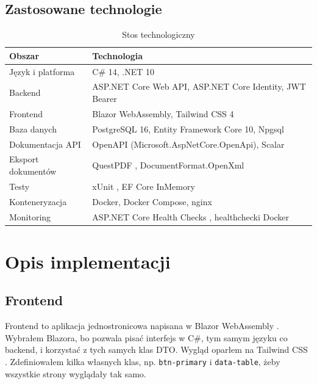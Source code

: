 \documentclass[times]{san}
\begin{document}
\subsection{Zastosowane technologie}

\begin{table}[H]
\centering
\caption{Stos technologiczny}
\label{tab:technologie}
\small
\begin{tabularx}{\textwidth}{|l|X|}
\hline
\textbf{Obszar} & \textbf{Technologia} \\
\hline
Język i platforma & C\# 14, .NET 10 \\
Backend & ASP.NET Core Web API, ASP.NET Core Identity, JWT Bearer \\
Frontend & Blazor WebAssembly, Tailwind CSS 4 \cite{tailwind} \\
Baza danych & PostgreSQL 16, Entity Framework Core 10, Npgsql \cite{npgsql} \\
Dokumentacja API & OpenAPI (Microsoft.AspNetCore.OpenApi), Scalar \\
Eksport dokumentów & QuestPDF \cite{questpdf}, DocumentFormat.OpenXml \cite{openxml} \\
Testy & xUnit \cite{xunit}, EF Core InMemory \\
Konteneryzacja & Docker, Docker Compose, nginx \\
Monitoring & ASP.NET Core Health Checks \cite{ms_healthchecks}, healthchecki Docker \\
\hline
\end{tabularx}
\end{table}

\section{Opis implementacji}

\subsection{Frontend}

Frontend to aplikacja jednostronicowa napisana w Blazor WebAssembly \cite{ms_blazor}. Wybrałem Blazora, bo pozwala pisać interfejs w C\#, tym samym języku co backend, i korzystać z tych samych klas DTO. Wygląd oparłem na Tailwind CSS \cite{tailwind}. Zdefiniowałem kilka własnych klas, np. \texttt{btn-primary} i \texttt{data-table}, żeby wszystkie strony wyglądały tak samo.
\end{document}
